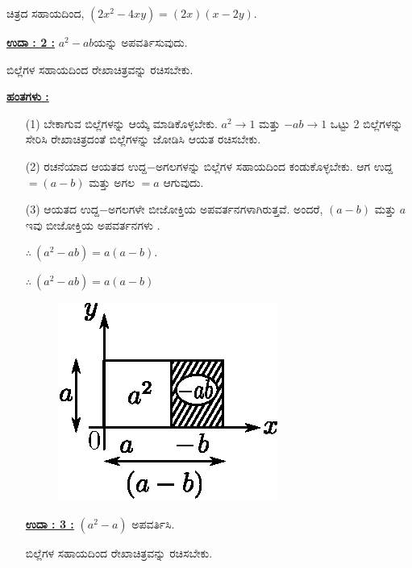 ಚಿತ್ರದ ಸಹಾಯದಿಂದ, $(2x^2 - 4xy) = (2x)(x-2y).$

\noindent
{\textbf{\underline{ಉದಾ : 2 :}}} $a^2 - ab$ಯನ್ನು ಅಪವರ್ತಿಸುವುದು. 

ಬಿಲ್ಲೆಗಳ ಸಹಾಯದಿಂದ ರೇಖಾಚಿತ್ರವನ್ನು ರಚಿಸಬೇಕು.

\noindent
{\textbf{\underline{ಹಂತಗಳು :}}}
\begin{itemize}
\item [(1)] ಬೇಕಾಗುವ ಬಿಲ್ಲೆಗಳನ್ನು ಆಯ್ಕೆ ಮಾಡಿಕೊಳ್ಳಬೇಕು. $a^2 \rightarrow 1$ ಮತ್ತು $-ab \rightarrow 1$ ಒಟ್ಟು 2 ಬಿಲ್ಲೆಗಳನ್ನು ಸೇರಿಸಿ ರೇಖಾಚಿತ್ರದಂತೆ ಬಿಲ್ಲೆಗಳನ್ನು ಜೋಡಿಸಿ ಆಯತ ರಚಿಸಬೇಕು. 
\item [(2)] ರಚನೆಯಾದ ಆಯತದ ಉದ್ದ$-$ಅಗಲಗಳನ್ನು ಬಿಲ್ಲೆಗಳ ಸಹಾಯದಿಂದ ಕಂಡು\break ಕೊಳ್ಳಬೇಕು. ಆಗ ಉದ್ದ $= (a-b)$ ಮತ್ತು ಅಗಲ $= a$ ಆಗುವುದು. 
\item [(3)] ಆಯತದ ಉದ್ದ$-$ಅಗಲಗಳೇ ಬೀಜೋಕ್ತಿಯ ಅಪವರ್ತನಗಳಾಗಿರುತ್ತವೆ. ಅಂದರೆ, $(a-b)$ ಮತ್ತು $a$ ಇವು ಬೀಜೋಕ್ತಿಯ ಅಪವರ್ತನಗಳು .

$\therefore~ (a^2 - ab) = a(a-b)$.


$\therefore \ (a^2 - ab) = a(a - b)$
\begin{figure}[H]
\centering
\includegraphics[scale=0.8]{src/figure/chap3/fig3-35b.eps}
\end{figure}

\noindent
{\textbf{\underline{ಉದಾ : 3 :}}} $(a^2 - a)$ ಅಪವರ್ತಿಸಿ. 

ಬಿಲ್ಲೆಗಳ ಸಹಾಯದಿಂದ ರೇಖಾಚಿತ್ರವನ್ನು ರಚಿಸಬೇಕು.
\end{itemize}

